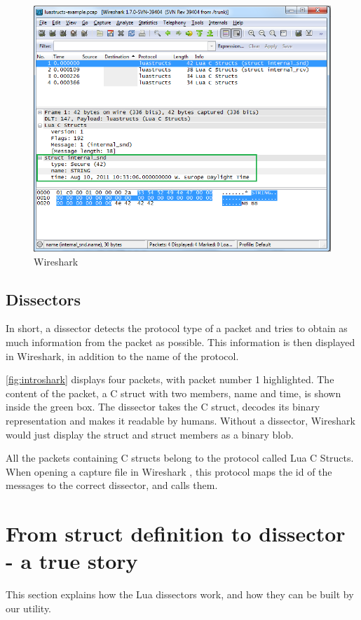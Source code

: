 \begin{figure}[ht]
	\includegraphics[width=\textwidth]{./img/wireshark_example.png}
	\caption{Wireshark\label{fig:introshark}}
\end{figure}

\subsection{Dissectors}
In short, a dissector detects the protocol type of a packet and tries to obtain as much information
from the packet as possible. This information is then displayed in Wireshark, in addition to the name of the protocol.

\autoref{fig:introshark} displays four packets, with packet number 1 highlighted.
The content of the packet, a C struct with two members, name and time,  is shown inside the green box.
The dissector takes the C struct, decodes its binary representation and makes it readable by humans.
Without a dissector, Wireshark would just display the struct and struct members as a binary blob.

All the packets containing C structs belong to the protocol called Lua C Structs.
When opening a capture file in Wireshark , this protocol maps the id of the messages to the correct dissector,
and calls them.

\section{From struct definition to dissector - a true story}
This section explains how the Lua dissectors work, and how they can be built by our utility.


